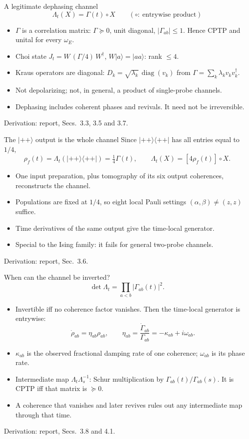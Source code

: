 \documentclass[aspectratio=169,11pt]{beamer}
\newcommand{\ket}[1]{\lvert #1\rangle}
\newcommand{\bra}[1]{\langle #1\rvert}
\newcommand{\diag}{\operatorname{diag}}
\newcommand{\report}[1]{{\color{muted}\footnotesize Derivation: report, #1.}}
\begin{document}
\begin{frame}{A legitimate dephasing channel}
\[
\boxed{\Lambda_t(X)=\Gamma(t)\circ X}\qquad(\circ:\ \text{entrywise product})
\]
\begin{itemize}\setlength\itemsep{6pt}
\item $\Gamma$ is a correlation matrix: $\Gamma\succeq0$, unit diagonal,
$|\Gamma_{ab}|\le1$. Hence CPTP and unital for every $\omega_E$.
\item Choi state $J_t=W\,(\Gamma/4)\,W^\dagger$, $W\ket a=\ket{aa}$: rank $\le4$.
\item Kraus operators are diagonal: $D_k=\sqrt{\lambda_k}\,\diag(v_k)$ from
$\Gamma=\sum_k\lambda_kv_kv_k^\dagger$.
\item Not depolarizing; not, in general, a product of single-probe channels.
\item Dephasing includes coherent phases and revivals. It need not be
irreversible.
\end{itemize}
\report{Secs.~3.3, 3.5 and 3.7}
\end{frame}

\begin{frame}{The $\ket{++}$ output is the whole channel}
Since $\ket{++}\bra{++}$ has all entries equal to $1/4$,
\[
\boxed{\rho_f(t)=\Lambda_t(\ket{++}\bra{++})=\tfrac14\Gamma(t),\qquad
\Lambda_t(X)=[4\rho_f(t)]\circ X.}
\]
\begin{itemize}\setlength\itemsep{7pt}
\item One input preparation, plus tomography of its six output coherences,
reconstructs the channel.
\item Populations are fixed at $1/4$, so eight local Pauli settings
$(\alpha,\beta)\ne(z,z)$ suffice.
\item Time derivatives of the same output give the time-local generator.
\item Special to the Ising family: it fails for general two-probe channels.
\end{itemize}
\report{Sec.~3.6}
\end{frame}

\begin{frame}{When can the channel be inverted?}
\[
\det\Lambda_t=\prod_{a<b}|\Gamma_{ab}(t)|^2 .
\]
\begin{itemize}\setlength\itemsep{6pt}
\item Invertible iff no coherence factor vanishes. Then the time-local
generator is entrywise:
\[
\dot\rho_{ab}=\eta_{ab}\rho_{ab},\qquad
\eta_{ab}=\frac{\dot\Gamma_{ab}}{\Gamma_{ab}}=-\kappa_{ab}+i\omega_{ab}.
\]
\item $\kappa_{ab}$ is the observed fractional damping rate of one
coherence; $\omega_{ab}$ is its phase rate.
\item Intermediate map $\Lambda_t\Lambda_s^{-1}$: Schur multiplication by
$\Gamma_{ab}(t)/\Gamma_{ab}(s)$. It is CPTP iff that matrix is $\succeq0$.
\item A coherence that vanishes and later revives rules out any
intermediate map through that time.
\end{itemize}
\report{Secs.~3.8 and 4.1}
\end{frame}
\end{document}
